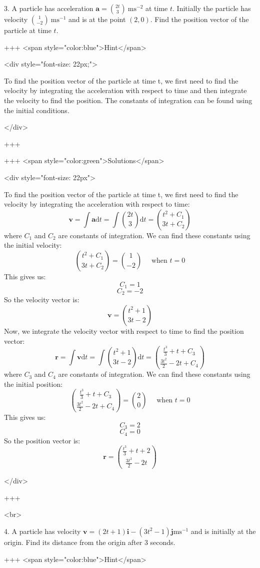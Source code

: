 3. A particle has acceleration $\mathbf{a}=\binom{2 t}{3} \mathrm{~ms}^{-2}$ at time $t$. Initially the particle has velocity $\binom{1}{-2} \mathrm{~ms}^{-1}$ and is at the point $(2,0)$. Find the position vector of the particle at time $t$.

+++ <span style="color:blue">Hint</span>

<div style="font-size: 22px;">

To find the position vector of the particle at time t, we first need to find the velocity by integrating the acceleration with respect to time and then integrate the velocity to find the position. The constants of integration can be found using the initial conditions. 

</div>

+++

+++ <span style="color:green">Solutions</span>

<div style="font-size: 22px">

To find the position vector of the particle at time t, we first need to find the velocity by integrating the acceleration with respect to time:
\[\mathbf{v}=\int \mathbf{a} \mathrm{d} t=\int\binom{2 t}{3} \mathrm{d} t=\binom{t^{2}+C_{1}}{3 t+C_{2}}\]
where $C_{1}$ and $C_{2}$ are constants of integration. We can find these constants using the initial velocity:
\[\binom{t^{2}+C_{1}}{3 t+C_{2}}=\binom{1}{-2} \quad \text { when } t=0\]
This gives us:
\[C_{1}=1\]
\[C_{2}=-2\]
So the velocity vector is:
\[\mathbf{v}=\binom{t^{2}+1}{3 t-2}\]
Now, we integrate the velocity vector with respect to time to find the position vector:
\[\mathbf{r}=\int \mathbf{v} \mathrm{d} t=\int\binom{t^{2}+1}{3 t-2} \mathrm{d} t=\binom{\frac{t^{3}}{3}+t+C_{3}}{\frac{3 t^{2}}{2}-2 t+C_{4}}\]
where $C_{3}$ and $C_{4}$ are constants of integration. We can find these constants using the initial position:
\[\binom{\frac{t^{3}}{3}+t+C_{3}}{\frac{3 t^{2}}{2}-2 t+C_{4}}=\binom{2}{0} \quad \text { when } t=0\]
This gives us:
\[C_{3}=2\]
\[C_{4}=0\]
So the position vector is:
\[\mathbf{r}=\binom{\frac{t^{3}}{3}+t+2}{\frac{3 t^{2}}{2}-2 t}\]

</div>

+++

<br>

4. A particle has velocity $\mathbf{v}=(2 t+1) \mathbf{i}-\left(3 t^{2}-1\right) \mathbf{j} \mathrm{ms}^{-1}$ and is initially at the origin. Find its distance from the origin after 3 seconds.

+++ <span style="color:blue">Hint</span>


